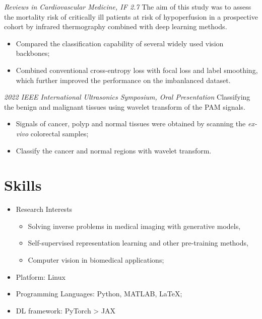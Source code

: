 \documentclass{resume}
\begin{document}
\textit{Reviews in Cardiovascular Medicine, IF 2.7}
The aim of this study was to assess the mortality risk of critically ill patients at risk of hypoperfusion in a prospective cohort by infrared thermography combined with deep learning methods.
\begin{itemize}
  \item Compared the classification capability of several widely used vision backbones;
  \item Combined conventional cross-entropy loss with focal loss and label smoothing, which further improved the performance on the imbanlanced dataset.
\end{itemize}

\textit{2022 IEEE International Ultrasonics Symposium, Oral Presentation}
Classifying the benign and malignant tissues using wavelet transform of the PAM signals.
\begin{itemize}
  \item Signals of cancer, polyp and normal tissues were obtained by scanning the \textit{ex-vivo} colorectal samples;
  \item Classify the cancer and normal regions with wavelet transform.
\end{itemize}


\section{\faCogs\quad Skills}
\begin{itemize}
    \item Research Interests
    \begin{itemize}
        \item Solving inverse problems in medical imaging with generative models,
        \item Self-supervised representation learning and other pre-training methods,
        \item Computer vision in biomedical applications;
    \end{itemize}
    \item Platform: Linux
    \item Programming Languages: Python, MATLAB, \LaTeX{};
    \item DL framework: PyTorch > JAX
\end{itemize}
\end{document}
